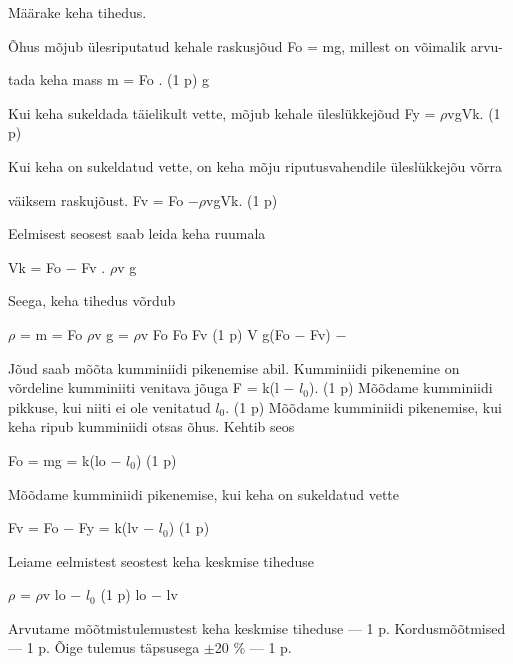 
Määrake keha tihedus.

\hint

\solu
Õhus mõjub ülesriputatud kehale raskusjõud Fo = mg, millest on võimalik arvu-

tada keha mass m = Fo . (1 p) g

Kui keha sukeldada täielikult vette, mõjub kehale üleslükkejõud Fy = $\rho$vgVk. (1 p)

Kui keha on sukeldatud vette, on keha mõju riputusvahendile üleslükkejõu võrra

väiksem raskujõust. Fv = Fo $- \rho$vgVk. (1 p)

Eelmisest seosest saab leida keha ruumala

Vk = Fo $-$ Fv . $\rho$v g

Seega, keha tihedus võrdub

$\rho$ = m = Fo $\rho$v g = $\rho$v Fo Fo Fv (1 p) V g(Fo $-$ Fv) $-$

Jõud saab mõõta kumminiidi pikenemise abil. Kumminiidi pikenemine on võrdeline kumminiiti venitava jõuga F = k(l $-$ $l_0$). (1 p) Mõõdame kumminiidi pikkuse, kui niiti ei ole venitatud $l_0$. (1 p) Mõõdame kumminiidi pikenemise, kui keha ripub kumminiidi otsas õhus. Kehtib seos

Fo = mg = k(lo $-$ $l_0$) (1 p)

Mõõdame kumminiidi pikenemise, kui keha on sukeldatud vette

Fv = Fo $-$ Fy = k(lv $-$ $l_0$) (1 p)

Leiame eelmistest seostest keha keskmise tiheduse

$\rho$ = $\rho$v lo $-$ $l_0$ (1 p) lo $-$ lv

Arvutame mõõtmistulemustest keha keskmise tiheduse --- 1 p. Kordusmõõtmised --- 1 p. Õige tulemus täpsusega $\pm$20 \% --- 1 p.
\probend
